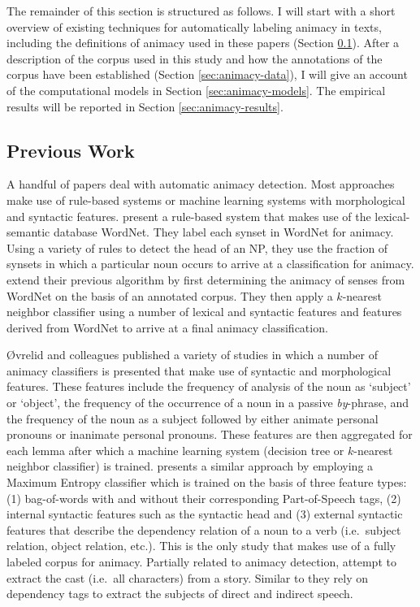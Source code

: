 The remainder of this section is structured as follows. I will start with a short overview of existing techniques for automatically labeling animacy in texts, including the definitions of animacy used in these papers (Section \ref{sec:animacy-previous-work}). After a description of the corpus used in this study and how the annotations of the corpus have been established (Section \ref{sec:animacy-data}), I will give an account of the computational models in Section \ref{sec:animacy-models}. The empirical results will be reported in Section \ref{sec:animacy-results}.

\subsection{Previous Work}\label{sec:animacy-previous-work}

A handful of papers deal with automatic animacy detection. Most approaches make use of rule-based systems or machine learning systems with morphological and syntactic features. \citeauthor{evans:2000} present a rule-based system that makes use of the lexical-semantic database WordNet\autocite{evans:2000}. They label each synset in WordNet for animacy. Using a variety of rules to detect the head of an NP, they use the fraction of synsets in which a particular noun occurs to arrive at a classification for animacy. \citeauthor{orasan:2001} extend their previous algorithm by first determining the animacy of senses from WordNet on the basis of an annotated corpus\autocite{orasan:2001}. They then apply a $k$-nearest neighbor classifier using a number of lexical and syntactic features and features derived from WordNet to arrive at a final animacy classification.

Øvrelid and colleagues published a variety of studies in which a number of animacy classifiers is presented that make use of syntactic and morphological features\autocite{ovrelid:2005,ovrelid:2006,ovrelid:2008}. These features include the frequency of analysis of the noun as `subject' or `object', the frequency of the occurrence of a noun in a passive \emph{by}-phrase, and the frequency of the noun as a subject followed by either animate personal pronouns or inanimate personal pronouns. These features are then aggregated for each lemma after which a machine learning system (decision tree or $k$-nearest neighbor classifier) is trained. \citeauthor{bowman:2012} presents a similar approach by employing a Maximum Entropy classifier which is trained on the basis of three feature types: (1) bag-of-words with and without their corresponding Part-of-Speech tags, (2) internal syntactic features such as the syntactic head and (3) external syntactic features that describe the dependency relation of a noun to a verb (i.e.\ subject relation, object relation, etc.).\autocite{bowman:2012}  This is the only study that makes use of a fully labeled corpus for animacy. Partially related to animacy detection, \citeauthor{karsdorp:2012b} attempt to extract the cast (i.e.\ all characters) from a story\autocite{karsdorp:2012b}. Similar to \citeauthor{bowman:2012} they rely on dependency tags to extract the subjects of direct and indirect speech.

